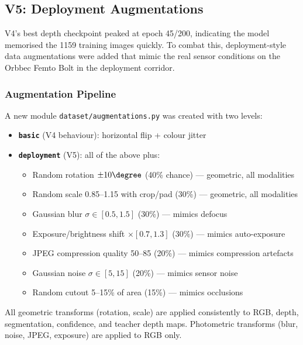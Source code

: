 \documentclass[11pt,a4paper]{article}
\begin{document}
\subsection{V5: Deployment Augmentations}
\label{sec:vivek-v5}

V4's best depth checkpoint peaked at epoch 45/200, indicating the model
memorised the 1159 training images quickly. To combat this, deployment-style
data augmentations were added that mimic the real sensor conditions on the
Orbbec Femto Bolt in the deployment corridor.

\subsubsection{Augmentation Pipeline}

A new module \texttt{dataset/augmentations.py} was created with two levels:

\begin{itemize}[nosep]
  \item \textbf{\texttt{basic}} (V4 behaviour): horizontal flip + colour jitter
  \item \textbf{\texttt{deployment}} (V5): all of the above plus:
    \begin{itemize}[nosep]
      \item Random rotation $\pm 10\degree$ (40\% chance) --- geometric, all modalities
      \item Random scale 0.85--1.15 with crop/pad (30\%) --- geometric, all modalities
      \item Gaussian blur $\sigma \in [0.5, 1.5]$ (30\%) --- mimics defocus
      \item Exposure/brightness shift $\times [0.7, 1.3]$ (30\%) --- mimics auto-exposure
      \item JPEG compression quality 50--85 (20\%) --- mimics compression artefacts
      \item Gaussian noise $\sigma \in [5, 15]$ (20\%) --- mimics sensor noise
      \item Random cutout 5--15\% of area (15\%) --- mimics occlusions
    \end{itemize}
\end{itemize}

All geometric transforms (rotation, scale) are applied consistently to RGB,
depth, segmentation, confidence, and teacher depth maps. Photometric transforms
(blur, noise, JPEG, exposure) are applied to RGB only.
\end{document}
